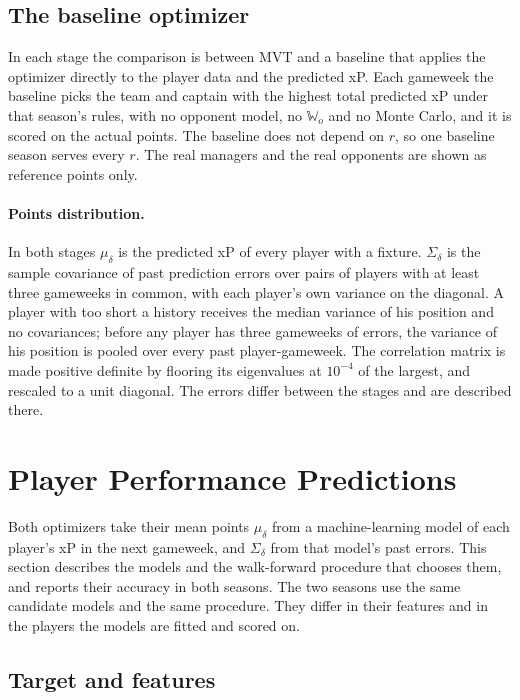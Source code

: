 \documentclass[12pt,oneside,a4paper]{book}
\theoremstyle{definition}
\theoremstyle{remark}
\begin{document}
	\subsection{The baseline optimizer}
	\label{sec:design-baseline}

	In each stage the comparison is between MVT and a baseline that applies the optimizer directly
	to the player data and the predicted xP. Each gameweek the baseline picks the team and captain
	with the highest total predicted xP under that season's rules, with no opponent model, no
	$\mathbb{W}_o$ and no Monte Carlo, and it is scored on the actual points. The baseline does not
	depend on $r$, so one baseline season serves every $r$. The real managers and the real opponents
	are shown as reference points only.

	\paragraph{Points distribution.} In both stages $\mu_\delta$ is the predicted xP of every player
	with a fixture. $\Sigma_\delta$ is the sample covariance of past prediction errors over pairs of
	players with at least three gameweeks in common, with each player's own variance on the
	diagonal. A player with too short a history receives the median variance of his position and no
	covariances; before any player has three gameweeks of errors, the variance of his position is
	pooled over every past player-gameweek. The correlation matrix is made positive definite by
	flooring its eigenvalues at $10^{-4}$ of the largest, and rescaled to a unit diagonal. The
	errors differ between the stages and are described there.

	\section{Player Performance Predictions}
	\label{sec:predictions}

	Both optimizers take their mean points $\mu_\delta$ from a machine-learning model of each
	player's xP in the next gameweek, and $\Sigma_\delta$ from that model's past errors. This
	section describes the models and the walk-forward procedure that chooses them, and reports
	their accuracy in both seasons. The two seasons use the same candidate models and the same
	procedure. They differ in their features and in the players the models are fitted and scored
	on.

	\subsection{Target and features}
	\label{sec:predictions-features}
\end{document}

